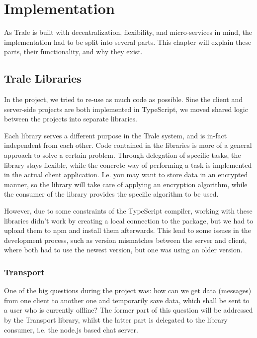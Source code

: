 \chapter{Implementation}\label{ch:implementation}
As Trale is built with decentralization, flexibility, and micro-services in mind, the implementation had to be split into several parts.
This chapter will explain these parts, their functionality, and why they exist.

\section{Trale Libraries}\label{sec:libraries}
In the project, we tried to re-use as much code as possible.
Sine the client and server-side projects are both implemented in TypeScript, we moved shared logic between the projects into separate libraries.

Each library serves a different purpose in the Trale system, and is in-fact independent from each other.
Code contained in the libraries is more of a general approach to solve a certain problem.
Through delegation of specific tasks, the library stays flexible, while the concrete way of performing a task is implemented in the actual client application.
I.e. you may want to store data in an encrypted manner, so the library will take care of applying an encryption algorithm, while the consumer of the library provides the specific algorithm to be used.

However, due to some constraints of the TypeScript compiler, working with these libraries didn't work by creating a local connection to the package, but we had to upload them to npm and install them afterwards.
This lead to some issues in the development process, such as version mismatches between the server and client, where both had to use the newest version, but one was using an older version.

\subsection{Transport}\label{subsec:transport}
One of the big questions during the project was: how can we get data (messages) from one client to another one and temporarily save data, which shall be sent to a user who is currently offline?
The former part of this question will be addressed by the Transport library, whilst the latter part is delegated to the library consumer, i.e. the node.js based chat server.

